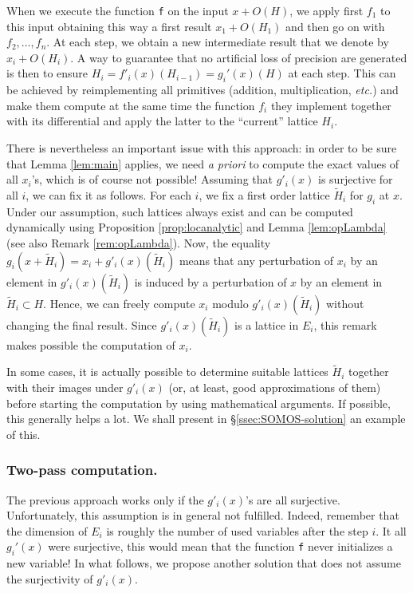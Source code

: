 \documentclass{lms}
\begin{document}
When we execute the function {\tt f} on the input $x + O(H)$, we apply 
first $f_1$ to this input obtaining this way a first result $x_1 + 
O(H_1)$ and then go on with $f_2, \ldots, f_n$. At each step, we obtain 
a new intermediate result that we denote by $x_i + O(H_i)$. A way to 
guarantee that no artificial loss of precision are generated is then to 
ensure $H_i = f'_i(x)(H_{i-1}) = g_i'(x)(H)$ at each step. This can be 
achieved by reimplementing all primitives (addition, multiplication, 
\emph{etc.}) and make them compute at the same time the function $f_i$
they implement together with its differential and apply the latter to
the ``current'' lattice $H_i$.

There is nevertheless an important issue with this approach: in order to 
be sure that Lemma \ref{lem:main} applies, we need \emph{a priori} to 
compute the exact values of all $x_i$'s, which is of course not 
possible! Assuming that $g'_i(x)$ is surjective for all $i$, we can fix 
it as follows. For each $i$, we fix a first order lattice $\tilde H_i$ 
for $g_i$ at $x$. Under our assumption, such lattices always exist and 
can be computed dynamically using Proposition \ref{prop:locanalytic}
and Lemma \ref{lem:opLambda} (see also Remark \ref{rem:opLambda}).
Now, the equality $g_i(x + \tilde H_i) = x_i + g'_i(x)(\tilde H_i)$ 
means that any perturbation of $x_i$ by an element in $g'_i(x) (\tilde 
H_i)$ is induced by a perturbation of $x$ by an element in $\tilde H_i 
\subset H$. Hence, we can freely compute $x_i$ modulo $g'_i(x) (\tilde 
H_i)$ without changing the final result. Since $g'_i(x)(\tilde H_i)$ is 
a lattice in $E_i$, this remark makes possible the computation of $x_i$.

\begin{rmk}
In some cases, it is actually possible to determine suitable lattices 
$\tilde H_i$ together with their images under $g'_i(x)$ (or, at
least, good approximations of them) before starting the computation 
by using mathematical arguments. If possible, this generally helps a
lot. We shall present in \S \ref{ssec:SOMOS-solution} an example of 
this.
\end{rmk}

\subsubsection*{Two-pass computation.}

The previous approach works only if the $g'_i(x)$'s are all surjective. 
Unfortunately, this assumption is in general not fulfilled. Indeed, 
remember that the dimension of $E_i$ is roughly the number of used 
variables after the step $i$. It all $g_i'(x)$ were surjective, this 
would mean that the function {\tt f} never initializes a new variable!
In what follows, we propose another solution that does not assume the
surjectivity of $g'_i(x)$.
\end{document}
